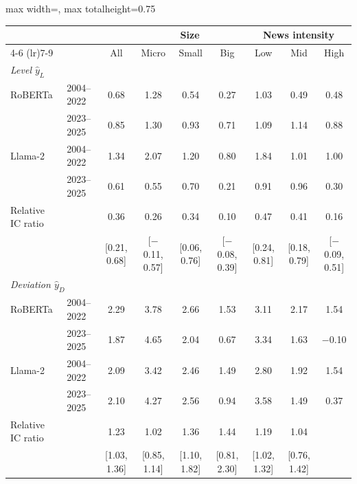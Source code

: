 \begin{table}[htbp]
{\footnotesize
\begin{adjustbox}{max width=\linewidth, max totalheight=0.75\textheight}
\begin{tabular}{llccccccc}
\toprule
\multicolumn{3}{c}{} & \multicolumn{3}{c}{Size} & \multicolumn{3}{c}{News intensity} \\
\cmidrule(lr){4-6} \cmidrule(lr){7-9}
 &  & All & Micro & Small & Big & Low & Mid & High \\
\midrule
\multicolumn{9}{l}{\textit{Level $\hat y_L$}} \\
RoBERTa & 2004--2022 & 0.68 & 1.28 & 0.54 & 0.27 & 1.03 & 0.49 & \phantom{$-$}0.48 \\
 & 2023--2025 & 0.85 & 1.30 & 0.93 & 0.71 & 1.09 & 1.14 & \phantom{$-$}0.88 \\
\midrule
Llama-2 & 2004--2022 & 1.34 & 2.07 & 1.20 & 0.80 & 1.84 & 1.01 & \phantom{$-$}1.00 \\
 & 2023--2025 & 0.61 & 0.55 & 0.70 & 0.21 & 0.91 & 0.96 & \phantom{$-$}0.30 \\
\midrule
Relative IC ratio &  & 0.36 & 0.26 & 0.34 & 0.10 & 0.47 & 0.41 & \phantom{$-$}0.16 \\
 &  & [0.21, 0.68] & [$-$0.11, 0.57] & [0.06, 0.76] & [$-$0.08, 0.39] & [0.24, 0.81] & [0.18, 0.79] & [$-$0.09, 0.51] \\
\midrule
\multicolumn{9}{l}{\textit{Deviation $\hat y_D$}} \\
RoBERTa & 2004--2022 & 2.29 & 3.78 & 2.66 & 1.53 & 3.11 & 2.17 & \phantom{$-$}1.54 \\
 & 2023--2025 & 1.87 & 4.65 & 2.04 & 0.67 & 3.34 & 1.63 & $-$0.10 \\
\midrule
Llama-2 & 2004--2022 & 2.09 & 3.42 & 2.46 & 1.49 & 2.80 & 1.92 & \phantom{$-$}1.54 \\
 & 2023--2025 & 2.10 & 4.27 & 2.56 & 0.94 & 3.58 & 1.49 & \phantom{$-$}0.37 \\
\midrule
Relative IC ratio &  & 1.23 & 1.02 & 1.36 & 1.44 & 1.19 & 1.04 &  \\
 &  & [1.03, 1.36] & [0.85, 1.14] & [1.10, 1.82] & [0.81, 2.30] & [1.02, 1.32] & [0.76, 1.42] &  \\
\bottomrule
\end{tabular}
\end{adjustbox}
}
\end{table}
